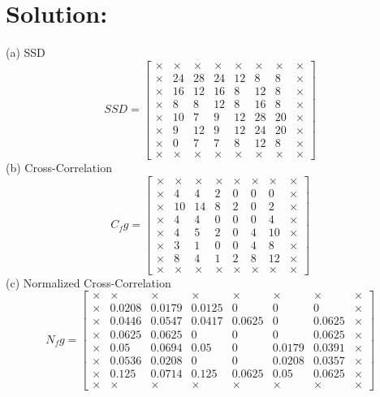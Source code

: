 \documentclass[12pt]{article}
\begin{document}
\section{Solution:}
(a) SSD
\begin{equation*}
SSD = \left[ \begin{array}{cccccccc}
\times & \times& \times& \times& \times &\times &\times & \times \\
\times &  24 & 28 & 24 & 12 & 8 & 8 & \times \\
\times &  16 & 12 & 16 & 8 & 12 & 8 & \times \\
\times &  8 & 8 & 12 & 8 & 16 & 8 & \times \\
\times &  10 & 7 & 9 & 12 & 28 & 20 & \times \\
\times &  9 & 12 & 9 & 12 & 24 & 20 & \times \\
\times &  0 & 7 & 7 & 8 & 12 & 8 & \times \\
\times & \times& \times& \times& \times &\times &\times & \times 
\end{array} \right]
\end{equation*}
(b) Cross-Correlation
\begin{equation*}
C_fg = \left[ \begin{array}{cccccccc}
\times & \times& \times& \times& \times &\times &\times & \times \\
\times &  4 & 4 & 2 & 0 & 0 & 0 & \times \\
\times &  10 & 14 & 8 & 2 & 0 & 2 & \times \\
\times &  4 & 4 & 0 & 0 & 0 & 4 & \times \\
\times &  4 & 5 & 2 & 0 & 4 & 10 & \times \\
\times &  3 & 1 & 0 & 0 & 4 & 8 & \times \\
\times &  8 & 4 & 1 & 2 & 8 & 12 & \times \\ 
\times & \times& \times& \times& \times &\times &\times & \times
\end{array} \right]
\end{equation*}
(c) Normalized Cross-Correlation
\begin{equation*}
N_fg = \left[ \begin{array}{cccccccc}
\times & \times& \times& \times& \times &\times &\times & \times \\
\times &  0.0208 & 0.0179 & 0.0125 & 0 & 0 & 0 & \times \\
\times &  0.0446&  0.0547 & 0.0417 & 0.0625&  0 & 0.0625& \times \\
\times &  0.0625  &0.0625 & 0 & 0 & 0 & 0.0625 &\times \\
\times &  0.05 & 0.0694 & 0.05 & 0 & 0.0179 & 0.0391& \times \\
\times &  0.0536 & 0.0208 & 0 & 0 & 0.0208 & 0.0357& \times \\
\times &  0.125 & 0.0714 & 0.125 & 0.0625&  0.05 & 0.0625 &\times \\
\times & \times& \times& \times& \times &\times &\times & \times 
\end{array} \right]
\end{equation*}
\end{document}
